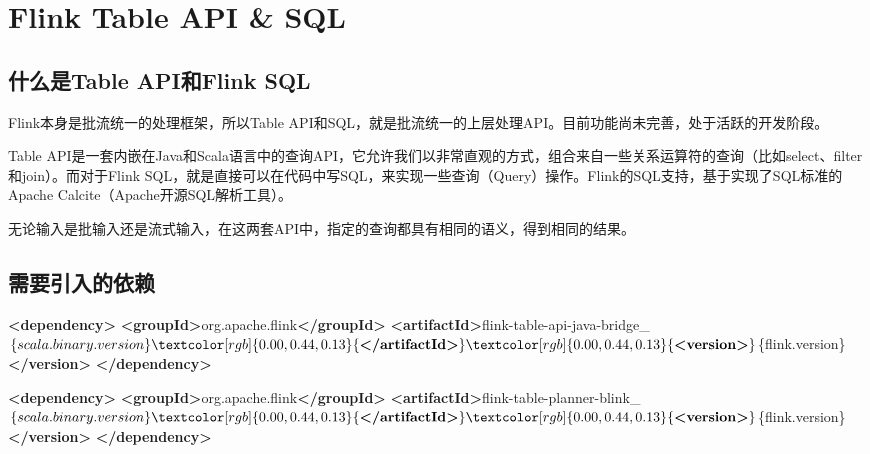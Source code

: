 \documentclass[cn,11pt,chinese]{elegantbook}
\newenvironment{Shaded}{}{}
\newcommand{\KeywordTok}[1]{\textcolor[rgb]{0.00,0.44,0.13}{\textbf{#1}}}
\newcommand{\NormalTok}[1]{#1}
\begin{document}
\hypertarget{flink-table-api-sql}{%
\chapter{Flink Table API \& SQL}\label{flink-table-api-sql}}

\hypertarget{ux4ec0ux4e48ux662ftable-apiux548cflink-sql}{%
\section{什么是Table API和Flink
SQL}\label{ux4ec0ux4e48ux662ftable-apiux548cflink-sql}}

Flink本身是批流统一的处理框架，所以Table
API和SQL，就是批流统一的上层处理API。目前功能尚未完善，处于活跃的开发阶段。

Table
API是一套内嵌在Java和Scala语言中的查询API，它允许我们以非常直观的方式，组合来自一些关系运算符的查询（比如select、filter和join）。而对于Flink
SQL，就是直接可以在代码中写SQL，来实现一些查询（Query）操作。Flink的SQL支持，基于实现了SQL标准的Apache
Calcite（Apache开源SQL解析工具）。

无论输入是批输入还是流式输入，在这两套API中，指定的查询都具有相同的语义，得到相同的结果。

\hypertarget{ux9700ux8981ux5f15ux5165ux7684ux4f9dux8d56}{%
\section{需要引入的依赖}\label{ux9700ux8981ux5f15ux5165ux7684ux4f9dux8d56}}

\begin{Shaded}
\begin{Highlighting}[]
\KeywordTok{\textless{}dependency\textgreater{}}
    \KeywordTok{\textless{}groupId\textgreater{}}\NormalTok{org.apache.flink}\KeywordTok{\textless{}/groupId\textgreater{}}
    \KeywordTok{\textless{}artifactId\textgreater{}}\NormalTok{flink{-}table{-}api{-}java{-}bridge\_$\{scala.binary.version\}}\KeywordTok{\textless{}/artifactId\textgreater{}}
    \KeywordTok{\textless{}version\textgreater{}}\NormalTok{$\{flink.version\}}\KeywordTok{\textless{}/version\textgreater{}}
\KeywordTok{\textless{}/dependency\textgreater{}}

\KeywordTok{\textless{}dependency\textgreater{}}
    \KeywordTok{\textless{}groupId\textgreater{}}\NormalTok{org.apache.flink}\KeywordTok{\textless{}/groupId\textgreater{}}
    \KeywordTok{\textless{}artifactId\textgreater{}}\NormalTok{flink{-}table{-}planner{-}blink\_$\{scala.binary.version\}}\KeywordTok{\textless{}/artifactId\textgreater{}}
    \KeywordTok{\textless{}version\textgreater{}}\NormalTok{$\{flink.version\}}\KeywordTok{\textless{}/version\textgreater{}}
\KeywordTok{\textless{}/dependency\textgreater{}}
\end{Highlighting}
\end{Shaded}
\end{document}

